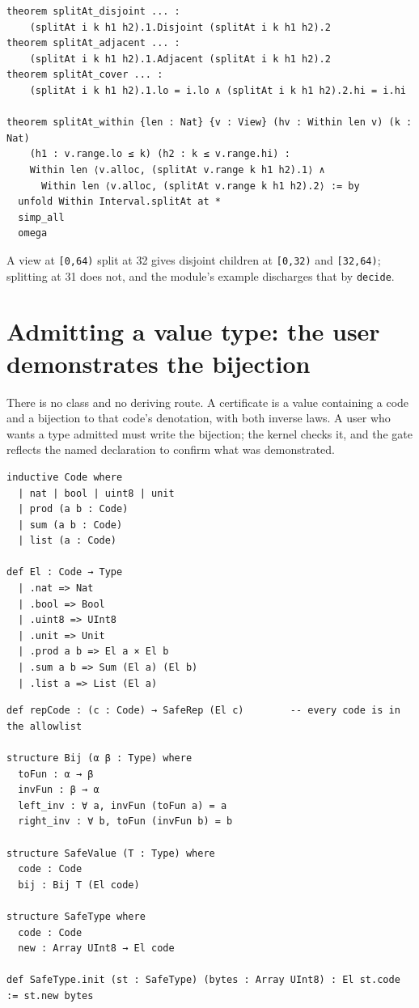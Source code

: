 \documentclass[10pt,a4paper]{article}
\newcommand{\file}[1]{\texttt{\small #1}}
\begin{document}
\begin{lstlisting}[caption={The split's facts and the within-preservation proof.}]
theorem splitAt_disjoint ... :
    (splitAt i k h1 h2).1.Disjoint (splitAt i k h1 h2).2
theorem splitAt_adjacent ... :
    (splitAt i k h1 h2).1.Adjacent (splitAt i k h1 h2).2
theorem splitAt_cover ... :
    (splitAt i k h1 h2).1.lo = i.lo ∧ (splitAt i k h1 h2).2.hi = i.hi

theorem splitAt_within {len : Nat} {v : View} (hv : Within len v) (k : Nat)
    (h1 : v.range.lo ≤ k) (h2 : k ≤ v.range.hi) :
    Within len ⟨v.alloc, (splitAt v.range k h1 h2).1⟩ ∧
      Within len ⟨v.alloc, (splitAt v.range k h1 h2).2⟩ := by
  unfold Within Interval.splitAt at *
  simp_all
  omega
\end{lstlisting}

A view at \texttt{[0,64)} split at 32 gives disjoint children at \texttt{[0,32)}
and \texttt{[32,64)}; splitting at 31 does not, and the module's example
discharges that by \texttt{decide}.

\section{Admitting a value type: the user demonstrates the bijection}\label{sec:admission}

There is no class and no deriving route. A certificate is a value containing a
code and a bijection to that code's denotation, with both inverse laws. A user who
wants a type admitted must write the bijection; the kernel checks it, and the gate
reflects the named declaration to confirm what was demonstrated.

\begin{lstlisting}[caption={\file{Cap/Code.lean}: the closed value universe.}]
inductive Code where
  | nat | bool | uint8 | unit
  | prod (a b : Code)
  | sum (a b : Code)
  | list (a : Code)

def El : Code → Type
  | .nat => Nat
  | .bool => Bool
  | .uint8 => UInt8
  | .unit => Unit
  | .prod a b => El a × El b
  | .sum a b => Sum (El a) (El b)
  | .list a => List (El a)
\end{lstlisting}

\begin{lstlisting}[caption={\file{Cap/Admission.lean}: the certificate and the gate.}]
def repCode : (c : Code) → SafeRep (El c)        -- every code is in the allowlist

structure Bij (α β : Type) where
  toFun : α → β
  invFun : β → α
  left_inv : ∀ a, invFun (toFun a) = a
  right_inv : ∀ b, toFun (invFun b) = b

structure SafeValue (T : Type) where
  code : Code
  bij : Bij T (El code)

structure SafeType where
  code : Code
  new : Array UInt8 → El code

def SafeType.init (st : SafeType) (bytes : Array UInt8) : El st.code := st.new bytes
\end{lstlisting}
\end{document}
